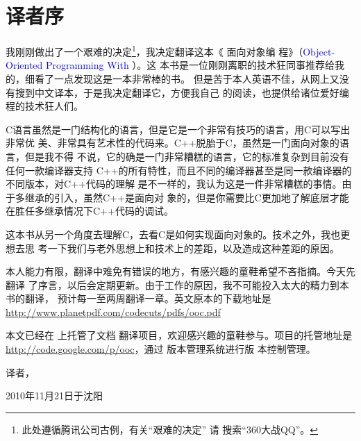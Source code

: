


\chapter{译者序}

我刚刚做出了一个艰难的决定\footnote{此处遵循腾讯公司古例，有关“艰难的决定”
请 \Google{} 搜索“360大战QQ”。}，我决定翻译这本《 面向对象编
程》（\textcolor{blue}{Object-Oriented Programming With }）。这
本书是一位刚刚离职的技术狂同事推荐给我的，细看了一点发现这是一本非常棒的书。
但是苦于本人英语不佳，从网上又没有搜到中文译本，于是我决定翻译它，方便我自己
的阅读，也提供给诸位爱好编程的技术狂人们。

C语言虽然是一门结构化的语言，但是它是一个非常有技巧的语言，用C可以写出非常优
美、非常具有艺术性的代码来。C++脱胎于C，虽然是一门面向对象的语言，但是我不得
不说，它的确是一门非常糟糕的语言，它的标准复杂到目前没有任何一款编译器支持
C++的所有特性，而且不同的编译器甚至是同一款编译器的不同版本，对C++代码的理解
是不一样的，我认为这是一件非常糟糕的事情。由于多继承的引入，虽然C++是面向对
象的，但是你需要比C更加地了解底层才能在胜任多继承情况下C++代码的调试。

这本书从另一个角度去理解C，去看C是如何实现面向对象的。技术之外，我也更想去思
考一下我们与老外思想上和技术上的差距，以及造成这种差距的原因。

\iffalse
本文通过\LaTeX{}进行排版，由于初次使用\LaTeX{}的Book模板，有些地方做的不
是很好敬请谅解～～
\fi %

本人能力有限，翻译中难免有错误的地方，有感兴趣的童鞋希望不吝指摘。今天先翻译
了序言，以后会定期更新。由于工作的原因，我不可能投入太大的精力到本书的翻译，
预计每一至两周翻译一章。英文原本的下载地址是
\url{http://www.planetpdf.com/codecuts/pdfs/ooc.pdf}

本文已经在  上托管了文档
翻译项目，欢迎感兴趣的童鞋参与。项目的托管地址是
\url{http://code.google.com/p/ooc}，通过 版本管理系统进行版
本控制管理。

\bigskip
\bigskip

\begin{flushright}
	译者，

	2010年11月21日于沈阳
\end{flushright}

